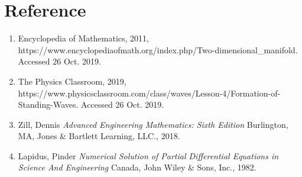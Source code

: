 \documentclass{article}
\begin{document}
\section{Reference}

\begin{enumerate}

\item Encyclopedia of Mathematics, 2011, https://www.encyclopediaofmath.org/index.php/Two-dimensional\_manifold. Accessed 26 Oct. 2019.

\item The Physics Classroom, 2019, https://www.physicsclassroom.com/class/waves/Lesson-4/Formation-of-Standing-Waves. Accessed 26 Oct. 2019.

\item Zill, Dennis \textit{Advanced Engineering Mathematics: Sixth Edition} Burlington, MA, Jones \& Bartlett Learning, LLC., 2018.

\item Lapidus, Pinder \textit{Numerical Solution of Partial Differential Equations in Science And Engineering} Canada, John Wiley \& Sons, Inc., 1982.

\end{enumerate}
\end{document}
